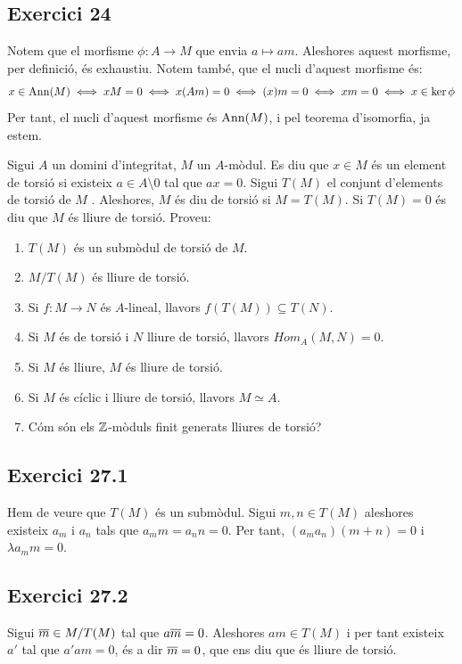 \documentclass[11pt, a4paper]{article}
\begin{document}
\subsection{Exercici 24}
Notem que el morfisme $\phi\colon A\to M$ que envia $a\mapsto am$. Aleshores aquest morfisme, per definició, és exhaustiu. Notem també, que el nucli d'aquest morfisme és:
\[
    x\in\mathrm{Ann}(M)\iff xM=0\iff x(Am)=0\iff(x) m=0\iff xm=0 \iff x\in \ker \phi
\]
Per tant, el nucli d'aquest morfisme és $\mathrm{Ann}(M)$, i pel teorema d'isomorfia, ja estem.
\newpage
\begin{tcolorbox}[title=\section{Exercici 27}]
    Sigui $A$ un domini d'integritat, $M$ un $A$-mòdul. Es diu que $x\in M$ és un element de torsió si existeix $a \in A \setminus {0}$ tal que $ax = 0$. Sigui $T (M )$ el conjunt d'elements de torsió de $M$ . Aleshores, $M$ és diu de torsió si $M = T (M)$. Si $T (M ) = 0$ és diu que $M$ és lliure de torsió. Proveu:
    \begin{enumerate}
        \item $T (M) $ és un submòdul de torsió de $M$.
        \item $M/T(M)$ és lliure de torsió.
        \item Si $f : M \to N$ és $A$-lineal, llavors $f (T (M )) \subseteq T (N )$.
        \item Si $M$ és de torsió i $N$ lliure de torsió, llavors $Hom_A(M, N ) = 0$.
        \item Si $M$ és lliure, $M$ és lliure de torsió.
        \item Si $M$ és cíclic i lliure de torsió, llavors $M \simeq A$.
        \item Cóm són els $\mathbb Z$-mòduls finit generats lliures de torsió?
    \end{enumerate}
\end{tcolorbox}
\subsection{Exercici 27.1}
Hem de veure que $T(M)$ és un submòdul. Sigui $m,n\in T(M)$ aleshores existeix $a_m$ i $a_n$ tals que $a_mm=a_nn=0$. Per tant, $(a_ma_n)(m+n)=0$ i $\lambda a_m m=0$.
\subsection{Exercici 27.2}
Sigui $\overline m\in M/T(M)$ tal que $a\overline m=0$. Aleshores $am\in T(M)$ i per tant existeix $a'$ tal que $a'am=0$, és a dir $\overline m=0$, que ens diu que és lliure de torsió.
\end{document}

